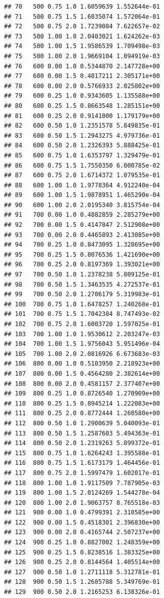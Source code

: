 \documentclass[11pt,a4paper]{article}
\begin{document}
\begin{verbatim}
## 70   500 0.75 1.0 1.6059639 1.552644e-01
## 71   500 0.75 1.5 1.6035074 1.572064e-01
## 72   500 0.75 2.0 1.7239084 7.622657e-02
## 73   500 1.00 1.0 2.0403021 1.624262e-03
## 74   500 1.00 1.5 1.9586539 1.709498e-03
## 75   500 1.00 2.0 1.9669104 1.094919e-03
## 76   600 0.00 1.0 0.5344870 2.147728e+00
## 77   600 0.00 1.5 0.4817211 2.305171e+00
## 78   600 0.00 2.0 0.5766933 2.025802e+00
## 79   600 0.25 1.0 0.9343605 1.135588e+00
## 80   600 0.25 1.5 0.8663548 1.285151e+00
## 81   600 0.25 2.0 0.9141000 1.179179e+00
## 82   600 0.50 1.0 1.2351578 5.849835e-01
## 83   600 0.50 1.5 1.2943275 4.979736e-01
## 84   600 0.50 2.0 1.2326393 5.888425e-01
## 85   600 0.75 1.0 1.6353797 1.329479e-01
## 86   600 0.75 1.5 1.7550350 6.000785e-02
## 87   600 0.75 2.0 1.6714372 1.079535e-01
## 88   600 1.00 1.0 1.9778364 4.912240e-04
## 89   600 1.00 1.5 1.9878951 1.465290e-04
## 90   600 1.00 2.0 2.0195340 3.815754e-04
## 91   700 0.00 1.0 0.4882859 2.285279e+00
## 92   700 0.00 1.5 0.4147847 2.512908e+00
## 93   700 0.00 2.0 0.4465893 2.413085e+00
## 94   700 0.25 1.0 0.8473095 1.328695e+00
## 95   700 0.25 1.5 0.8076536 1.421690e+00
## 96   700 0.25 2.0 0.8197369 1.393021e+00
## 97   700 0.50 1.0 1.2378238 5.809125e-01
## 98   700 0.50 1.5 1.3463535 4.272537e-01
## 99   700 0.50 2.0 1.2706179 5.319983e-01
## 100  700 0.75 1.0 1.6478257 1.240268e-01
## 101  700 0.75 1.5 1.7042384 8.747493e-02
## 102  700 0.75 2.0 1.6003720 1.597025e-01
## 103  700 1.00 1.0 1.9530612 2.203247e-03
## 104  700 1.00 1.5 1.9756043 5.951496e-04
## 105  700 1.00 2.0 2.0816926 6.673683e-03
## 106  800 0.00 1.0 0.5103950 2.218923e+00
## 107  800 0.00 1.5 0.4564280 2.382614e+00
## 108  800 0.00 2.0 0.4581157 2.377407e+00
## 109  800 0.25 1.0 0.8726540 1.270909e+00
## 110  800 0.25 1.5 0.8945214 1.222083e+00
## 111  800 0.25 2.0 0.8772444 1.260580e+00
## 112  800 0.50 1.0 1.2900639 5.040093e-01
## 113  800 0.50 1.5 1.2587603 5.494363e-01
## 114  800 0.50 2.0 1.2319263 5.899372e-01
## 115  800 0.75 1.0 1.6264243 1.395588e-01
## 116  800 0.75 1.5 1.6173179 1.464456e-01
## 117  800 0.75 2.0 1.5997479 1.602017e-01
## 118  800 1.00 1.0 1.9117509 7.787905e-03
## 119  800 1.00 1.5 2.0124269 1.544278e-04
## 120  800 1.00 2.0 1.9063757 8.765518e-03
## 121  900 0.00 1.0 0.4799391 2.310585e+00
## 122  900 0.00 1.5 0.4518301 2.396830e+00
## 123  900 0.00 2.0 0.4165744 2.507237e+00
## 124  900 0.25 1.0 0.8827002 1.248359e+00
## 125  900 0.25 1.5 0.8238516 1.383325e+00
## 126  900 0.25 2.0 0.8144564 1.405514e+00
## 127  900 0.50 1.0 1.2711118 5.312781e-01
## 128  900 0.50 1.5 1.2685788 5.349769e-01
## 129  900 0.50 2.0 1.2165253 6.138326e-01

\end{verbatim}
\end{document}
